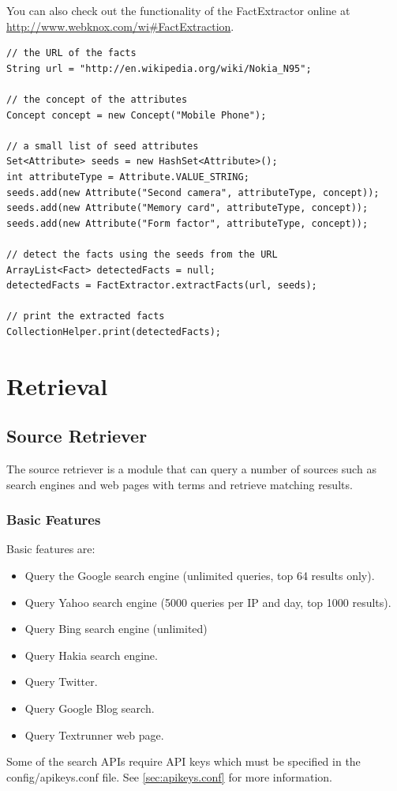 \documentclass[a4paper,twoside]{book}      %
\begin{document}
You can also check out the functionality of the FactExtractor online at \url{http://www.webknox.com/wi#FactExtraction}.

\begin{codelisting}
\begin{lstlisting}[label=listing:factExtraction,caption=Extract a list of facts from a web page.,frame=tb]
// the URL of the facts
String url = "http://en.wikipedia.org/wiki/Nokia_N95";

// the concept of the attributes
Concept concept = new Concept("Mobile Phone");

// a small list of seed attributes
Set<Attribute> seeds = new HashSet<Attribute>();
int attributeType = Attribute.VALUE_STRING;
seeds.add(new Attribute("Second camera", attributeType, concept));
seeds.add(new Attribute("Memory card", attributeType, concept));
seeds.add(new Attribute("Form factor", attributeType, concept));

// detect the facts using the seeds from the URL
ArrayList<Fact> detectedFacts = null;
detectedFacts = FactExtractor.extractFacts(url, seeds);
		
// print the extracted facts
CollectionHelper.print(detectedFacts);
\end{lstlisting}
\end{codelisting}

\section{Retrieval}

\subsection{Source Retriever}
The source retriever is a module that can query a number of sources such as search engines and web pages with terms and retrieve matching results.
\subsubsection{Basic Features}
Basic features are:
\begin{itemize}
\item Query the Google search engine (unlimited queries, top 64 results only).
\item Query Yahoo search engine (5000 queries per IP and day, top 1000 results).
\item Query Bing search engine (unlimited)
\item Query Hakia search engine.
\item Query Twitter.
\item Query Google Blog search.
\item Query Textrunner web page.
\end{itemize}
Some of the search APIs require API keys which must be specified in the config/apikeys.conf file. See \ref{sec:apikeys.conf} for more information.
\end{document}
